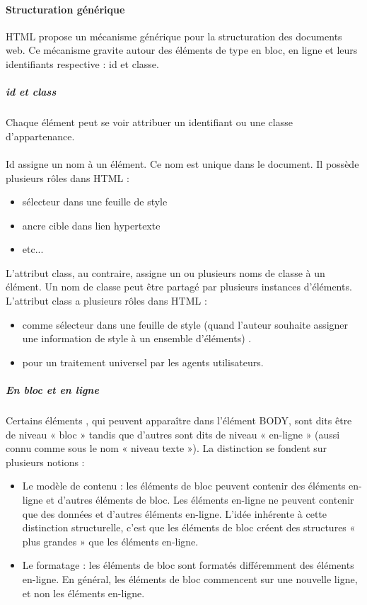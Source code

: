 \paragraph{Structuration générique}
HTML propose un mécanisme générique pour la structuration des documents web. Ce mécanisme gravite autour des éléments de type en bloc, en ligne et leurs identifiants respective : id et classe.

\subparagraph{id et class}
Chaque élément peut se voir attribuer un identifiant ou une classe d'appartenance.\\ 
\\
Id assigne un nom à un élément. Ce nom est unique dans le document. Il possède plusieurs rôles dans HTML : 
\begin{itemize}
\item sélecteur dans une feuille de style
\item ancre cible dans lien hypertexte
\item etc...
\end{itemize}
L'attribut class, au contraire, assigne un ou plusieurs noms de classe à un élément. Un nom de classe peut être partagé par plusieurs instances d'éléments. L'attribut class a plusieurs rôles dans HTML :
\begin{itemize}
\item comme sélecteur dans une feuille de style (quand l'auteur souhaite assigner une information de style à un ensemble d'éléments) .
\item pour un traitement universel par les agents utilisateurs.
\end{itemize}


\subparagraph{En bloc et en ligne}
Certains éléments , qui peuvent apparaître dans l'élément BODY, sont dits être de niveau « bloc » tandis que d'autres sont dits de niveau « en-ligne » (aussi connu comme sous le nom « niveau texte »). La distinction se fondent sur plusieurs notions :
\begin{itemize}
\item Le modèle de contenu : les éléments de bloc peuvent contenir des éléments en-ligne et d'autres éléments de bloc. Les éléments en-ligne ne peuvent contenir que des données et d'autres éléments en-ligne. L'idée inhérente à cette distinction structurelle, c'est que les éléments de bloc créent des structures « plus grandes » que les éléments en-ligne.
\item Le formatage : les éléments de bloc sont formatés différemment des éléments en-ligne. En général, les éléments de bloc commencent sur une nouvelle ligne, et non les éléments en-ligne.
\end{itemize}


